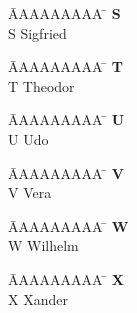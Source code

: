 \documentclass[a4paper, fleqn, headsepline, footsepline, 12pt, parskip=half]{scrartcl}
\begin{document}
\vspace*{-1.5cm}
\begin{tabbing}
	\hspace{0.0cm}  \= AAAAAAAAA \=       \hspace{2cm} \kill
	\>\textbf{S} 	\> \\
	\>S 			\>  Sigfried\\
\end{tabbing}

\vspace*{-1.5cm}
\begin{tabbing}
	\hspace{0.0cm}  \= AAAAAAAAA \=       \hspace{2cm} \kill
	\>\textbf{T} 	\> \\
	\>T 			\>  Theodor\\
\end{tabbing}

\vspace*{-1.5cm}
\begin{tabbing}
	\hspace{0.0cm}  \= AAAAAAAAA \=       \hspace{2cm} \kill
	\>\textbf{U} 	\> \\
	\>U 			\>  Udo\\
\end{tabbing}

\vspace*{-1.5cm}
\begin{tabbing}
	\hspace{0.0cm}  \= AAAAAAAAA \=       \hspace{2cm} \kill
	\>\textbf{V} 	\> \\
	\>V 			\>  Vera\\
\end{tabbing}

\vspace*{-1.5cm}
\begin{tabbing}
	\hspace{0.0cm}  \= AAAAAAAAA \=       \hspace{2cm} \kill
	\>\textbf{W} 	\> \\
	\>W 			\>  Wilhelm\\
\end{tabbing}

\vspace*{-1.5cm}
\begin{tabbing}
	\hspace{0.0cm}  \= AAAAAAAAA \=       \hspace{2cm} \kill
	\>\textbf{X} 	\> \\
	\>X 			\>  Xander\\
\end{tabbing}
\end{document}

